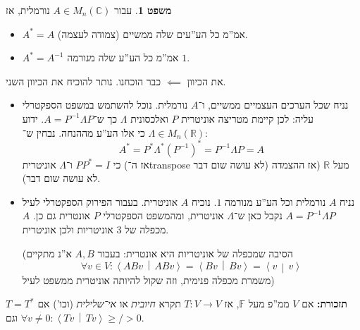 \documentclass[a4paper]{article}
\newcommand\R     {\mathbb{R}}
\newcommand\C     {\mathbb{C}}
\newcommand\ra    {\rangle}
\newcommand\la    {\langle}
\newcommand\F         {\mathbb{F}}
\newcommand\co        {\colon}
\newcommand\mut [2]   {\left \la #1 \,\middle\vert\, #2 \right \ra}
\newcommand\Lg        {\Lambda}
\newcommand\op    {^{-1}}
\theoremstyle{definition}
\newtheorem{Theorem}{משפט}
\newcommand\theo  [1] {\begin{Theorem}#1\end{Theorem}}
\begin{document}
	\theo{עבור $A \in M_n(\C)$ נורמלית, אז
		\begin{itemize}
			\item $A^* = A$ (צמודה לעצמה) אמ''מ כל הע''עים שלה ממשיים. 
			\item $A^* = A\op$ אמ''מ כל הע''ע שלה מנורמה $1$. 
	\end{itemize}}
	את הכיוון $\impliedby$ כבר הוכחנו. נותר להוכיח את הכיוון השני. 
	\begin{itemize}
		\item נניח שכל הערכים העצמיים ממשיים, ו־$A$ נורמלית. נוכל להשתמש במשפט הספקטרלי עליה: לכן קיימת מטריצה אוניטרית $P$ ואלכסונית $\Lg$ כך ש־$A = P\op \Lg P$. ידוע $\Lg \in M_n(\R)$ כי אלו הע''ע מההנחה. נבחין ש־: 
		\[ A^* = P^* \Lg^* (P\op)^* = P\op \Lg P = A \]
		כי $PP^* =I$ ו־$\Lg$ אוניטרית (אז ה־transpose לא עושה שום דבר) מעל $\R$ (אז ההצמדה לא עושה שום דבר). 
		\item נניח $A$ נורמלית וכל הע''ע מנורמה $1$. נוכיח $A$ אוניטרית. בעבור הפירוק הספקטרלי לעיל $A = P\op \Lg P$ נקבל כאן ש־$\Lg$ אוניטרית, ומהמשפט הספקטרלי $P$ אונטרית גם כן. $A$ מכפלה של 3 אוניטריות ולכן אוניטרית. 
		
		(הסיבה שמכפלה של אוניטריות היא אונטרית: בעבור $A, B$ א''נ מתקיים
		\[ \forall v \in V \co \mut{ABv}{ABv} = \mut{Bv}{Bv} = \mut{v}{v} \]
		משמרת מכפלה פנימית, וזה שקול להיותה אוניטרית ממשפט לעיל)
	\end{itemize}
	
	\textbf{תזכורת: }אם $V$ ממ''פ מעל $\F$, אז $T \co V \to V$ תקרא \textit{חיובית} או \textit{אי־שלילית} (וכו') אם $T = T^*$ וגם $\forall v \neq 0 \co \mut{Tv}{Tv} \ge\!/\!> 0$. 
	
\end{document}
